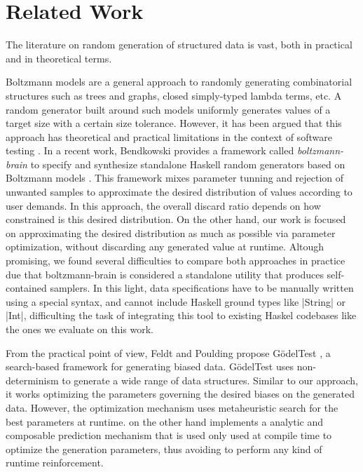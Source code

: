 \section{Related Work}

The literature on random generation of structured data is vast, both in
practical and in theoretical terms.

%
%
Boltzmann models \cite{Duchon2004} are a general approach to randomly generating
combinatorial structures such as trees and graphs, closed simply-typed lambda
terms, etc.
%
A random generator built around such models uniformly generates values of a
target size with a certain size tolerance.
%
However, it has been argued that this approach has theoretical and practical
limitations in the context of software testing \cite{feldt2013}.
%
In a recent work, Bendkowski provides a framework called \emph{boltzmann-brain}
to specify and synthesize standalone Haskell random generators based on
Boltzmann models \cite{bendkowski2018}.
%
This framework mixes parameter tunning and rejection of unwanted samples to
approximate the desired distribution of values according to user demands.
%
In this approach, the overall discard ratio depends on how constrained is this
desired distribution.
%
On the other hand, our work is focused on approximating the desired distribution
as much as possible via parameter optimization, without discarding any generated
value at runtime.
%
Altough promising, we found several difficulties to compare both approaches in
practice due that boltzmann-brain is considered a standalone utility that
produces self-contained samplers.
%
In this light, data specifications have to be manually written using a special
syntax, and cannot include Haskell ground types like |String| or |Int|,
difficulting the task of integrating this tool to existing Haskel codebases like
the ones we evaluate on this work.



%
%
From the practical point of view, Feldt and Poulding propose G\"odelTest
\cite{feldt2013}, a search-based framework for generating biased data.
%
G\"odelTest uses non-determinism to generate a wide range of data structures.
%
Similar to our approach, it works optimizing the parameters governing the
desired biases on the generated data.
%
However, the optimization mechanism uses metaheuristic search for the best
parameters at runtime.
%
\dragenp on the other hand implements a analytic and composable prediction
mechanism that is used only used at compile time to optimize the generation
parameters, thus avoiding to perform any kind of runtime reinforcement.


